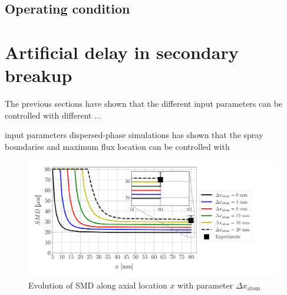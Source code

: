 \clearpage

\subsection{Operating condition}


\clearpage

\section{Artificial delay in secondary breakup}
\label{sec:LGS_delay_secon_atom}

The previous sections have shown that the different input parameters can be controlled with different ...

input parameters dispersed-phase simulations has shown that the spray boundaries and maximum flux location can be controlled with 

\begin{figure}[h!]
\centering
\includegraphics[scale=0.5]{./part2_developments/figures_ch6_lagrangian_JICF/params_dx_atom/SMD_vs_x_dx_atom_comparison}
\caption[Evolution of SMD along axial location $x$ with parameter $\Delta x_\mathrm{atom}$]{Evolution of SMD along axial location $x$ with parameter $\Delta x_\mathrm{atom}$}
\label{fig:SMD_vs_x_param_dx_atom}
\end{figure}

